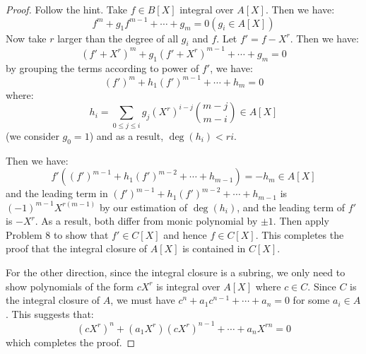 \documentclass{solution}
\begin{document}
\begin{proof}
    Follow the hint. Take $f \in B[X]$ integral over $A[X]$. Then we have:
    $$f^m + g_1f^{m - 1} + \cdots + g_m = 0(g_i \in A[X])$$
    Now take $r$ larger than the degree of all $g_i$ and $f$. Let $f' = f - X^r$. Then we have:
    $$(f' + X^r)^m + g_1(f' + X^r)^{m - 1} + \cdots + g_m = 0$$
    by grouping the terms according to power of $f'$, we have:
    $$(f')^m + h_1(f')^{m - 1} + \cdots + h_m = 0$$
    where:
    $$h_i = \sum\limits_{0 \le j \le i} g_j (X^r)^{i - j} {{m - j}\choose{m - i}} \in A[X]$$
    (we consider $g_0 = 1$) and as a result, $\deg(h_i) \lt ri$. 

    Then we have:
    $$f'\left((f')^{m - 1} + h_1 (f')^{m - 2} + \cdots + h_{m - 1}\right) = -h_m \in A[X]$$
    and the leading term in $(f')^{m - 1} + h_1 (f')^{m - 2} + \cdots + h_{m - 1}$ is $(-1)^{m - 1} X^{r(m - 1)}$ by our estimation of $\deg(h_i)$, and the leading term of $f'$ is $-X^r$. As a result, both differ from monic polynomial by $\pm 1$. Then apply Problem 8 to show that $f' \in C[X]$ and hence $f \in C[X]$. This completes the proof that the integral closure of $A[X]$ is contained in $C[X]$.

    For the other direction, since the integral closure is a subring, we only need to show polynomials of the form $cX^r$ is integral over $A[X]$ where $c \in C$. Since $C$ is the integral closure of $A$, we must have $c^n + a_1c^{n - 1} + \cdots + a_n = 0$ for some $a_i \in A$. This suggests that:
    $$(cX^r)^n + (a_1 X^r) (cX^r)^{n - 1} + \cdots + a_n X^{rn} = 0$$
    which completes the proof.
\end{proof}
\end{document}
